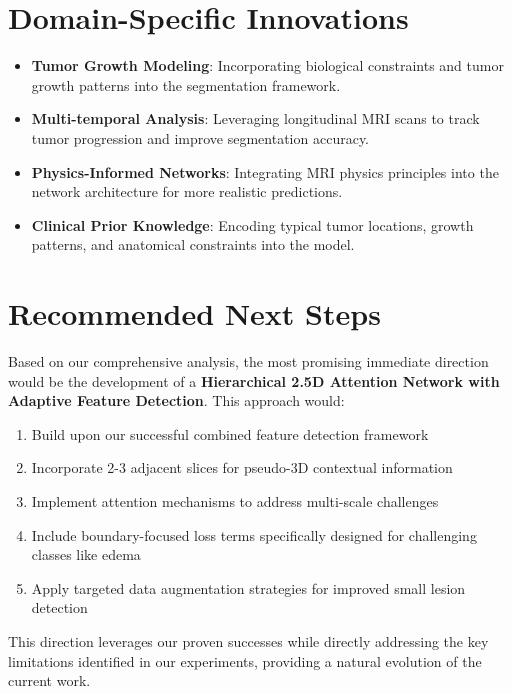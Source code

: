 \section{Domain-Specific Innovations}

\begin{itemize}
    \item \textbf{Tumor Growth Modeling}: Incorporating biological constraints and tumor growth patterns into the segmentation framework.
    
    \item \textbf{Multi-temporal Analysis}: Leveraging longitudinal MRI scans to track tumor progression and improve segmentation accuracy.
    
    \item \textbf{Physics-Informed Networks}: Integrating MRI physics principles into the network architecture for more realistic predictions.
    
    \item \textbf{Clinical Prior Knowledge}: Encoding typical tumor locations, growth patterns, and anatomical constraints into the model.
\end{itemize}

\section{Recommended Next Steps}

Based on our comprehensive analysis, the most promising immediate direction would be the development of a \textbf{Hierarchical 2.5D Attention Network with Adaptive Feature Detection}. This approach would:

\begin{enumerate}
    \item Build upon our successful combined feature detection framework
    \item Incorporate 2-3 adjacent slices for pseudo-3D contextual information
    \item Implement attention mechanisms to address multi-scale challenges
    \item Include boundary-focused loss terms specifically designed for challenging classes like edema
    \item Apply targeted data augmentation strategies for improved small lesion detection
\end{enumerate}

This direction leverages our proven successes while directly addressing the key limitations identified in our experiments, providing a natural evolution of the current work.

